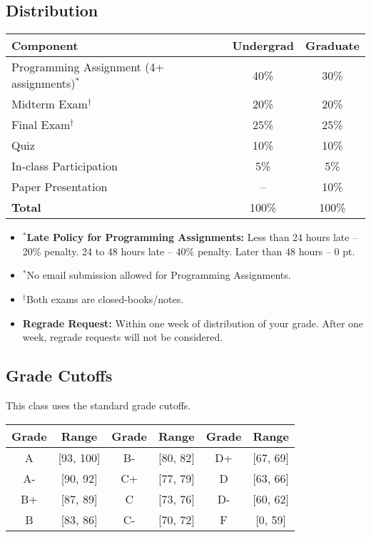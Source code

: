 \documentclass[11pt,letterpaper]{article}
\begin{document}
\subsection{Distribution}

\begin{table}[h]
\centering
\begin{tabular}{lcc}
\toprule
\textbf{Component} & \textbf{Undergrad} & \textbf{Graduate} \\
\midrule
Programming Assignment (4+ assignments)$^*$ & 40\% & 30\% \\
Midterm Exam$^\dagger$ & 20\% & 20\% \\
Final Exam$^\dagger$ & 25\% & 25\% \\
Quiz & 10\% & 10\% \\
In-class Participation & 5\% & 5\% \\
Paper Presentation & -- & 10\% \\
\midrule
\textbf{Total} & 100\% & 100\% \\
\bottomrule
\end{tabular}
\end{table}

\begin{itemize}[leftmargin=*]
    \item $^*$\textbf{Late Policy for Programming Assignments:} Less than 24 hours late -- 20\% penalty. 24 to 48 hours late -- 40\% penalty. Later than 48 hours -- 0 pt.
    \item $^*$No email submission allowed for Programming Assignments.
    \item $^\dagger$Both exams are closed-books/notes.
    \item \textbf{Regrade Request:} Within one week of distribution of your grade. After one week, regrade requests will not be considered.
\end{itemize}

\subsection{Grade Cutoffs}

This class uses the standard grade cutoffs.

\begin{table}[h]
\centering
\begin{tabular}{cc|cc|cc}
\toprule
\textbf{Grade} & \textbf{Range} & \textbf{Grade} & \textbf{Range} & \textbf{Grade} & \textbf{Range} \\
\midrule
A  & [93, 100] & B- & [80, 82] & D+ & [67, 69] \\
A- & [90, 92]  & C+ & [77, 79] & D  & [63, 66] \\
B+ & [87, 89]  & C  & [73, 76] & D- & [60, 62] \\
B  & [83, 86]  & C- & [70, 72] & F  & [0, 59]  \\
\bottomrule
\end{tabular}
\end{table}
\end{document}
